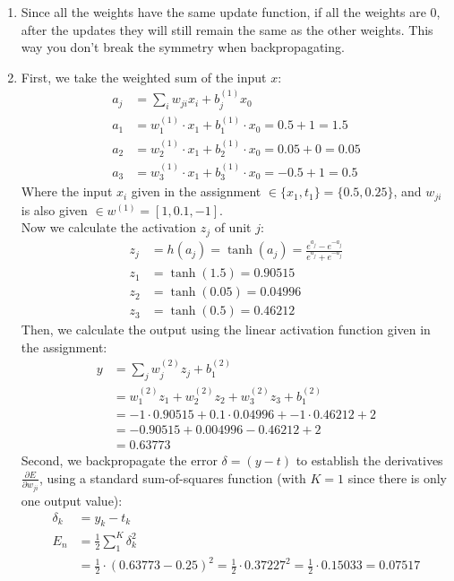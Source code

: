 \documentclass[a4paper,10pt]{article}
\numberwithin{equation}{section} %
\numberwithin{figure}{section} %
\numberwithin{table}{section} %
\theoremstyle{mytheor}
\begin{document}
\begin{enumerate}
	\item Since all the weights have the same update function, if all the weights are $0$,  after the updates they will still remain the same as the other weights. This way you don't break the symmetry when backpropagating.
	\item First, we take the weighted sum of the input $x$:
		\begin{align*}
		a_j &= \sum_i w_{ji}x_i + b_j^{(1)} x_0\\
		a_1 &= w_{1}^{(1)} \cdot x_1 + b_{1}^{(1)} \cdot x_0 = 0.5 + 1 = 1.5\\
		a_2 &= w_{2}^{(1)} \cdot x_1 + b_{2}^{(1)} \cdot x_0 = 0.05 + 0 = 0.05 \\
		a_3 &= w_{3}^{(1)} \cdot x_1 + b_{3}^{(1)} \cdot x_0 = -0.5 + 1 = 0.5
		\end{align*}
		\noindent Where the input $x_i$ given in the assignment $\in \{x_1,t_1\} = \{0.5, 0.25\}$, and $w_{ji}$ is also given $\in w^{(1)} = [1,0.1,-1]$.\\
		Now we calculate the activation $z_j$ of unit $j$:
		\begin{align*}
		z_j &= h(a_j) = \tanh(a_j) = \frac{e^{a_j} - e^{-a_j}}{e^{a_j} + e^{-a_j}}\\
		z_1 &= \tanh(1.5) = 0.90515\\
		z_2 &= \tanh(0.05) = 0.04996\\
		z_3 &= \tanh(0.5) = 0.46212
		\end{align*}
		Then, we calculate the output using the linear activation function given in the assignment:
		\begin{align*}
		y &= \sum_j w_j^{(2)}z_j + b_1^{(2)}\\
		&= w_1^{(2)}z_1 + w_2^{(2)}z_2 + w_3^{(2)}z_3 + b_1^{(2)}\\
		&= -1 \cdot 0.90515 + 0.1 \cdot 0.04996 + -1 \cdot 0.46212 + 2\\
		&= -0.90515 + 0.004996 - 0.46212 + 2 \\
		&= 0.63773
		\end{align*}
		Second, we backpropagate the error $\delta = (y - t)$ to establish the derivatives $\frac{\partial E}{\partial w_{ji}}$, using a standard sum-of-squares function (with $K = 1$ since there is only one output value):
		\begin{align*}
		\delta_k &= y_k - t_k\\
		E_n &= \frac{1}{2} \sum_1^K \delta_k^2\\
		&= \frac{1}{2} \cdot (0.63773 - 0.25)^2 = \frac{1}{2} \cdot 0.37227^2 = \frac{1}{2} \cdot 0.15033 = 0.07517

\end{align*}
\end{enumerate}
\end{document}
